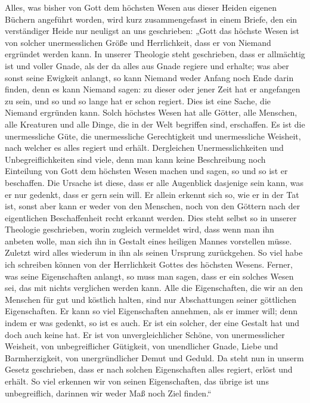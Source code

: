 \documentclass{article}
\begin{document}
Alles, was bisher von Gott dem höchsten Wesen aus dieser Heiden eigenen Büchern angeführt worden, wird kurz zusammengefasst in einem Briefe, den ein verständiger Heide nur neuligst an uns geschrieben: „Gott das höchste Wesen ist von solcher unermesslichen Größe und Herrlichkeit, dass er von Niemand ergründet werden kann. In unserer Theologie steht geschrieben, dass er allmächtig ist und voller Gnade, als der da alles aus Gnade regiere und erhalte; was aber sonst seine Ewigkeit anlangt, so kann Niemand weder Anfang noch Ende darin finden, denn es kann Niemand sagen: zu dieser oder jener Zeit hat er angefangen zu sein, und so und so lange hat er schon regiert. Dies ist eine Sache, die Niemand ergründen kann. Solch höchstes Wesen hat alle Götter, alle Menschen, alle Kreaturen und alle Dinge, die in der Welt begriffen sind, erschaffen. Es ist die unermessliche Güte, die unermessliche Gerechtigkeit und unermessliche Weisheit, nach welcher es alles regiert und erhält. Dergleichen Unermesslichkeiten und Unbegreiflichkeiten sind viele, denn man kann keine Beschreibung noch Einteilung von Gott dem höchsten Wesen machen und sagen, so und so ist er beschaffen. Die Ursache ist diese, dass er alle Augenblick dasjenige sein kann, was er nur gedenkt, dass er gern sein will. Er allein erkennt sich so, wie er in der Tat ist, sonst aber kann er weder von den Menschen, noch von den Göttern nach der eigentlichen Beschaffenheit recht erkannt werden. Dies steht selbst so in unserer Theologie geschrieben, worin zugleich vermeldet wird, dass wenn man ihn anbeten wolle, man sich ihn in Gestalt eines heiligen Mannes vorstellen müsse. Zuletzt wird alles wiederum in ihn als seinen Ursprung zurückgehen. So viel habe ich schreiben können von der Herrlichkeit Gottes des höchsten Wesens. Ferner, was seine Eigenschaften anlangt, so muss man sagen, dass er ein solches Wesen sei, das mit nichts verglichen werden kann. Alle die Eigenschaften, die wir an den Menschen für gut und köstlich halten, sind nur Abschattungen seiner göttlichen Eigenschaften. Er kann so viel Eigenschaften annehmen, als er immer will; denn indem er was gedenkt, so ist es auch. Er ist ein solcher, der eine Gestalt hat und doch auch keine hat. Er ist von unvergleichlicher Schöne, von unermesslicher Weisheit, von unbegreiflicher Gütigkeit, von unendlicher Gnade, Liebe und Barmherzigkeit, von unergründlicher Demut und Geduld. Da steht nun in unserm Gesetz geschrieben, dass er nach solchen Eigenschaften alles regiert, erlöst und erhält. So viel erkennen wir von seinen Eigenschaften, das übrige ist uns unbegreiflich, darinnen wir weder Maß noch Ziel finden.“
\end{document}
